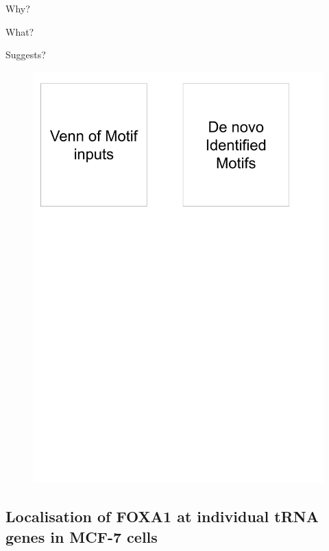 \documentclass[
  12pt,
]{article}
\begin{document}
Why?

What?

Suggests?

\begin{figure}[H]

{\centering \includegraphics[width=1\linewidth]{../images/results-04} 

}

\end{figure}

\hypertarget{localisation-of-foxa1-at-individual-trna-genes-in-mcf-7-cells}{%
\subsection{Localisation of FOXA1 at individual tRNA genes in MCF-7 cells}\label{localisation-of-foxa1-at-individual-trna-genes-in-mcf-7-cells}}
\end{document}
